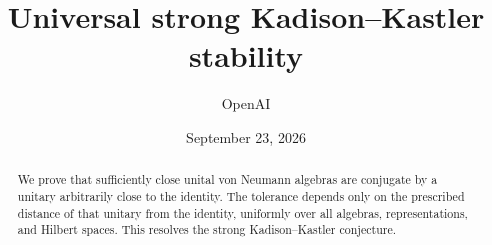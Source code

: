 \documentclass[11pt]{article}
\title{Universal strong Kadison--Kastler stability}
\author{OpenAI}
\date{September 23, 2026}
\begin{document}
\maketitle
\begin{abstract}
We prove that sufficiently close unital von Neumann algebras are
conjugate by a unitary arbitrarily close to the identity. The tolerance
depends only on the prescribed distance of that unitary from the
identity, uniformly over all algebras, representations, and Hilbert
spaces. This resolves the strong Kadison--Kastler conjecture.
\end{abstract}
\tableofcontents

\newpage








\appendix

\begingroup
\raggedright
\setlength{\bibsep}{5pt}


\endgroup
\end{document}
